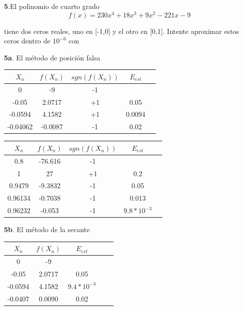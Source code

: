 \documentclass[12pt]{article}
\begin{document}
\textbf{5}.El polinomio de cuarto grado
$$
f(x) = 230x^4 + 18x^3 + 9x^2 - 221x - 9
$$

tiene dos ceros reales, uno en [-1,0] y el otro en [0,1]. Intente aproximar estos ceros dentro de $10^{-6}$ con

\textbf{5a}. El método de posición falsa

\begin{center}
    \begin{tabular}{|c|c|c|c|c|}
        \hline
        $X_n$&$f(X_n)$&$sgn(f(X_n))$&$E_{est}$\\
        \hline
        0        &-9& -1& \\
        -0.05    &2.0717&+1&0.05\\
        -0.0594  &4.1582&+1&0.0094\\
        -0.04062 &-0.0087&-1&0.02\\
        \hline
      \end{tabular} 
\end{center}

\begin{center}
    \begin{tabular}{|c|c|c|c|c|}
        \hline
        $X_n$&$f(X_n)$&$sgn(f(X_n))$&$E_{est}$\\
        \hline
        0.8     &-76.616& -1& \\
        1       &27     &+1&0.2\\
        0.9479  &-9.3832&-1&0.05\\
        0.96134 &-0.7038&-1&0.013\\
        0.96232 &-0.053&-1&$9.8*10^{-3}$\\
        \hline
      \end{tabular} 
\end{center}

\textbf{5b}. El método de la secante

\begin{center}
    \begin{tabular}{|c|c|c|c|c|}
        \hline
        $X_n$&$f(X_n)$&$E_{est}$\\
        \hline
        0        &-9&  \\
        -0.05     &2.0717&0.05\\
        -0.0594  &4.1582&$9.4*10^{-3}$\\
        -0.0407  &0.0090&0.02\\
        \hline
      \end{tabular} 
\end{center}
\end{document}
